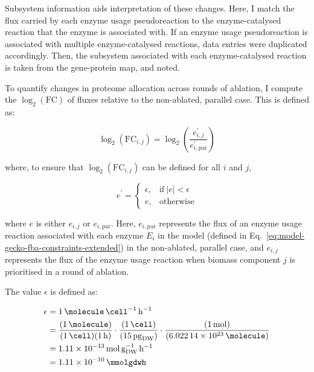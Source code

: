 Subsystem information aids interpretation of these changes.
Here, I match the flux carried by each enzyme usage pseudoreaction to the enzyme-catalysed reaction that the enzyme is associated with.
If an enzyme usage pseudoreaction is associated with multiple enzyme-catalysed reactions, data entries were duplicated accordingly.
Then, the subsystem associated with each enzyme-catalysed reaction is taken from the gene-protein map, and noted.

To quantify changes in proteome allocation across rounds of ablation, I compute the $\log_{2}(\mathrm{FC})$ of fluxes relative to the non-ablated, parallel case.
This is defined as:

\begin{equation}
  \log_{2}(\mathrm{FC}_{i,j}) = \log_{2}\left( \frac{e_{i,j}^{\prime}}{e_{i, \mathrm{par}}^{\prime}} \right)
  \label{eq:model-foldchange}
\end{equation}

where, to ensure that $\log_{2}(\mathrm{FC}_{i,j})$ can be defined for all $i$ and $j$,

\begin{equation}
  e^{\prime} =
  \begin{cases}
    \epsilon, & \text{if}\ |e|<\epsilon \\
    e, & \text{otherwise}
  \end{cases}
  \label{eq:model-epsilon-round}
\end{equation}

where $e$ is either $e_{i,j}$ or $e_{i, \mathrm{par}}$.
Here, $e_{i, \mathrm{par}}$ represents the flux of an enzyme usage reaction associated with each enzyme $E_{i}$ in the model (defined in Eq.\ \ref{eq:model-gecko-fba-constraints-extended}) in the non-ablated, parallel case, and $e_{i,j}$ represents the flux of the enzyme usage reaction when biomass component $j$ is prioritised in a round of ablation.

The value $\epsilon$ is defined as:

\begin{equation}
  \begin{aligned}
    \epsilon &= \SI{1}{\molecule~\cell^{-1}~\hour^{-1}}\\
             &= \frac{(\SI{1}{\molecule})}{(\SI{1}{\cell})(\SI{1}{\hour})} \cdot \frac{(\SI{1}{\cell})}{(\SI{15}{\pico\gram_{DW}})} \cdot \frac{(\SI{1}{\mol})}{(\SI{6.02214d23}{\molecule)}}\\
             &= \SI{1.11d-13}{\mol~\gram_{DW}^{-1}~\hour^{-1}}\\
             &= \SI{1.11d-10}{\mmolgdwh}\\
  \end{aligned}
  \label{eq:model-epsilon}
\end{equation}

